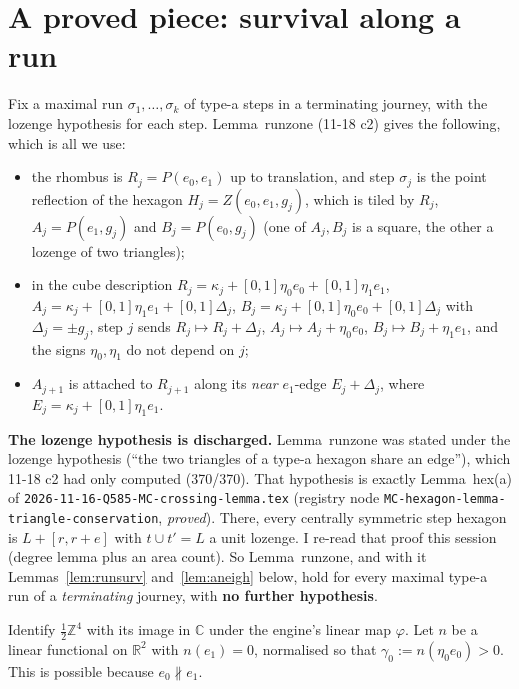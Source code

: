 \documentclass[11pt]{article}
\theoremstyle{definition}\newtheorem{definition}[theorem]{Definition}\newtheorem{remark}[theorem]{Remark}
\begin{document}
\section{A proved piece: survival along a run}\label{sec:lemma}
Fix a maximal run $\sigma_1,\dots,\sigma_k$ of type-a steps in a terminating journey, with the lozenge hypothesis for each step. Lemma~runzone (11-18 c2) gives the following, which is all we use:
\begin{itemize}
\item[(R1)] the rhombus is $R_j=P(e_0,e_1)$ up to translation, and step $\sigma_j$ is the point reflection of the hexagon $H_j=Z(e_0,e_1,g_j)$, which is tiled by $R_j$, $A_j=P(e_1,g_j)$ and $B_j=P(e_0,g_j)$ (one of $A_j,B_j$ is a square, the other a lozenge of two triangles);
\item[(R2)] in the cube description $R_j=\kappa_j+[0,1]\eta_0e_0+[0,1]\eta_1e_1$, $A_j=\kappa_j+[0,1]\eta_1e_1+[0,1]\Delta_j$, $B_j=\kappa_j+[0,1]\eta_0e_0+[0,1]\Delta_j$ with $\Delta_j=\pm g_j$, step $j$ sends $R_j\mapsto R_j+\Delta_j$, $A_j\mapsto A_j+\eta_0e_0$, $B_j\mapsto B_j+\eta_1e_1$, and the signs $\eta_0,\eta_1$ do not depend on $j$;
\item[(R3)] $A_{j+1}$ is attached to $R_{j+1}$ along its \emph{near} $e_1$-edge $E_j+\Delta_j$, where $E_j=\kappa_j+[0,1]\eta_1e_1$.
\end{itemize}
\noindent\textbf{The lozenge hypothesis is discharged.} Lemma~runzone was stated under the lozenge hypothesis (``the two triangles of a type-a hexagon share an edge''), which 11-18 c2 had only computed (370/370).
That hypothesis is exactly Lemma~hex(a) of \texttt{2026-11-16-Q585-MC-crossing-lemma.tex} (registry node \texttt{MC-hexagon-lemma-triangle-conservation}, \emph{proved}). There, every centrally symmetric step hexagon is $L+[r,r+e]$ with $t\cup t'=L$ a unit lozenge.
I re-read that proof this session (degree lemma plus an area count). So Lemma~runzone, and with it Lemmas~\ref{lem:runsurv} and~\ref{lem:aneigh} below, hold for every maximal type-a run of a \emph{terminating} journey, with \textbf{no further hypothesis}.

Identify $\tfrac12\mathbb Z^4$ with its image in $\mathbb C$ under the engine's linear map $\varphi$. Let $n$ be a linear functional on $\mathbb R^2$ with $n(e_1)=0$, normalised so that $\gamma_0:=n(\eta_0e_0)>0$. This is possible because $e_0\nparallel e_1$.
\end{document}
